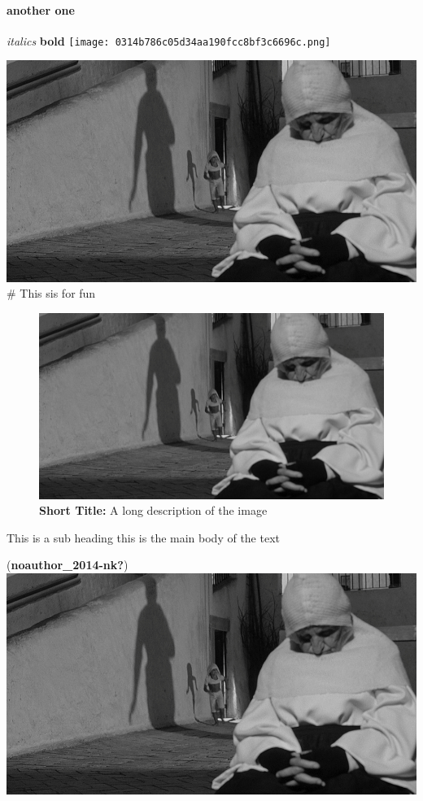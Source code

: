 \documentclass[
  12pt,
]{book}
\begin{document}
\hypertarget{another-one}{%
\paragraph{another one}\label{another-one}}

\emph{italics} \textbf{bold} \texttt{[image: 0314b786c05d34aa190fcc8bf3c6696c.png]}

\includegraphics{fd4fef9a20383db8ff25d8806505b409.png} \# This sis for fun

\begin{figure}[ht]

\centering

\includegraphics[width=\linewidth]{fd4fef9a20383db8ff25d8806505b409.png}

\caption[Short Title]{\textbf{Short Title:} A long description of the image}

\label{fig:foo}

\end{figure}

This is a sub heading this is the main body of the text

(\textbf{noauthor\_2014-nk?}) \includegraphics{fd4fef9a20383db8ff25d8806505b409.png}
\end{document}
